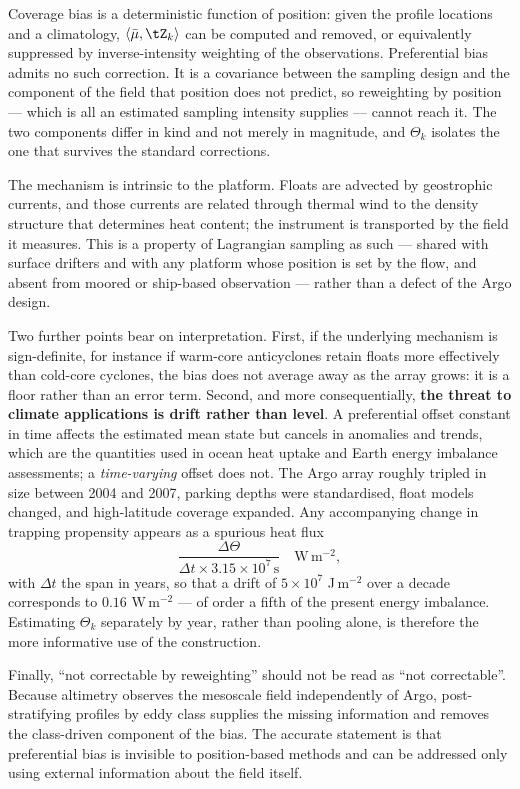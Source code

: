 \begin{remark}
\label{rem:whycare}
Coverage bias is a deterministic function of position: given the profile locations and a
climatology, $\langle \bar{\mu}, \tZ_k\rangle$ can be computed and removed, or equivalently
suppressed by inverse-intensity weighting of the observations. Preferential bias admits no such
correction. It is a covariance between the sampling design and the component of the field that
position does not predict, so reweighting by position --- which is all an estimated sampling
intensity supplies --- cannot reach it. The two components differ in kind and not merely in
magnitude, and $\Theta_k$ isolates the one that survives the standard corrections.

The mechanism is intrinsic to the platform. Floats are advected by geostrophic currents, and
those currents are related through thermal wind to the density structure that determines heat
content; the instrument is transported by the field it measures. This is a property of Lagrangian
sampling as such --- shared with surface drifters and with any platform whose position is set by
the flow, and absent from moored or ship-based observation --- rather than a defect of the Argo
design.

Two further points bear on interpretation. First, if the underlying mechanism is sign-definite,
for instance if warm-core anticyclones retain floats more effectively than cold-core cyclones,
the bias does not average away as the array grows: it is a floor rather than an error term.
Second, and more consequentially, \textbf{the threat to climate applications is drift rather than
level}. A preferential offset constant in time affects the estimated mean state but cancels in
anomalies and trends, which are the quantities used in ocean heat uptake and Earth energy
imbalance assessments; a \emph{time-varying} offset does not. The Argo array roughly tripled in
size between 2004 and 2007, parking depths were standardised, float models changed, and
high-latitude coverage expanded. Any accompanying change in trapping propensity appears as a
spurious heat flux
\begin{equation}
  \label{eq:flux}
  \frac{\Delta\Theta}{\Delta t \times 3.15\times10^{7}\,\mathrm{s}} \quad \mathrm{W\,m^{-2}},
\end{equation}
with $\Delta t$ the span in years, so that a drift of $5\times10^{7}$ J\,m$^{-2}$ over a decade
corresponds to $0.16$ W\,m$^{-2}$ --- of order a fifth of the present energy imbalance.
Estimating $\Theta_k$ separately by year, rather than pooling alone, is therefore the more
informative use of the construction.

Finally, ``not correctable by reweighting'' should not be read as ``not correctable''. Because
altimetry observes the mesoscale field independently of Argo, post-stratifying profiles by eddy
class supplies the missing information and removes the class-driven component of the bias. The
accurate statement is that preferential bias is invisible to position-based methods and can be
addressed only using external information about the field itself.
\end{remark}


